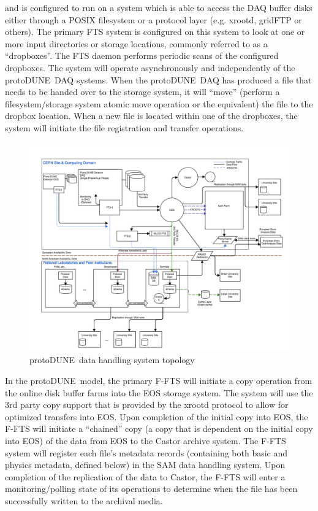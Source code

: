 \documentclass[pdftex,12pt,letter]{article}
\newcommand{\pd}{protoDUNE\ }
\begin{document}
 and is configured to run on a system which is able to access the DAQ buffer disks either through a POSIX filesystem or
a protocol layer (e.g. xrootd, gridFTP or others).  The primary FTS system is configured on this system
to look at one or more input directories or storage locations, commonly referred to as a ``dropboxes''.
The FTS daemon performs periodic scans of the configured dropboxes. The system will operate asynchronously
and independently of the \pd DAQ systems.  When the \pd DAQ has produced a file that needs to be handed over
to the storage system, it will ``move'' (perform a filesystem/storage system atomic move operation or the equivalent)
the file to the dropbox location. When a new file is located within one of the dropboxes,
the system will initiate the file registration and transfer operations.

\begin{figure}[tbh]
\centering\includegraphics[width=0.99\linewidth]{protDune-datahandling-topology.png}
\caption{\label{fig:sys_topology}\pd data handling system topology}
\end{figure}
In the \pd model, the primary F-FTS will initiate a copy operation from the online disk buffer farms into the EOS storage system. 
The system will use the 3rd party copy support that is provided by the xrootd protocol to allow for optimized transfers into EOS. 
Upon completion of the initial copy into EOS, the F-FTS will initiate a ``chained'' copy (a copy that is dependent on the initial copy into EOS)
of the data from EOS to the Castor archive system.  The F-FTS system will register each file’s metadata records (containing both basic and
physics metadata, defined below)  in the SAM data handling system.  Upon completion of the replication of the data to Castor,
the F-FTS will enter a monitoring/polling state of its operations to determine when the file has been successfully written to the archival media.
\end{document}
